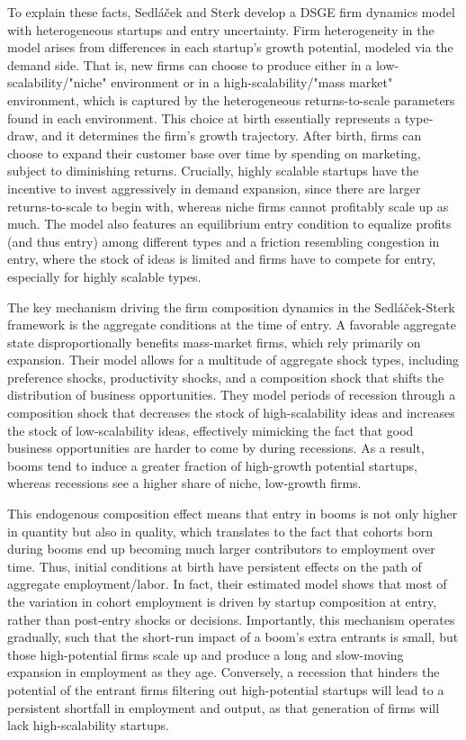 \documentclass[a4paper,12pt]{article} %
\numberwithin{equation}{section} %
\numberwithin{figure}{section}
\numberwithin{table}{section}
\begin{document}
To explain these facts, Sedláček and Sterk develop a DSGE firm dynamics model with heterogeneous startups and entry uncertainty. Firm heterogeneity in the model arises
from differences in each startup's growth potential, modeled via the demand side. That is, new firms can choose to produce either in a low-scalability/"niche" 
environment or in a high-scalability/"mass market" environment, which is captured by the heterogeneous returns-to-scale parameters found in each environment. 
This choice at birth essentially represents a type-draw, and it determines the firm's growth trajectory. After birth, firms can choose to expand their customer 
base over time by spending on marketing, subject to diminishing returns. Crucially, highly scalable startups have the incentive to invest aggressively in demand
expansion, since there are larger returns-to-scale to begin with, whereas niche firms cannot profitably scale up as much. 
The model also features an equilibrium entry condition to equalize profits (and thus entry) among different types and a friction resembling congestion in entry,
where the stock of ideas is limited and firms have to compete for entry, especially for highly scalable types.

The key mechanism driving the firm composition dynamics in the Sedláček-Sterk framework is the aggregate conditions at the time of entry. 
A favorable aggregate state disproportionally benefits mass-market firms, which rely primarily on expansion. 
Their model allows for a multitude of aggregate shock types, including preference shocks, productivity shocks, and a composition shock that shifts the distribution of business opportunities. 
They model periods of recession through a composition shock that decreases the stock of high-scalability ideas and increases the stock of 
low-scalability ideas, effectively mimicking the fact that good business opportunities are harder to come by during recessions. As a result, 
booms tend to induce a greater fraction of high-growth potential startups, whereas recessions see a higher share of niche, low-growth firms. 

This endogenous composition effect means that entry in booms is not only higher in quantity but also in quality, which translates to the 
fact that cohorts born during booms end up becoming much larger contributors to employment over time. Thus, initial conditions at birth 
have persistent effects on the path of aggregate employment/labor. In fact, their estimated model shows that most of the variation in 
cohort employment is driven by startup composition at entry, rather than post-entry shocks or decisions. Importantly, this mechanism 
operates gradually, such that the short-run impact of a boom's extra entrants is small, but those high-potential firms scale up and 
produce a long and slow-moving expansion in employment as they age. Conversely, a recession that hinders the potential of the entrant 
firms filtering out high-potential startups will lead to a persistent shortfall in employment and output, as that generation of firms will lack 
high-scalability startups.
\end{document}

